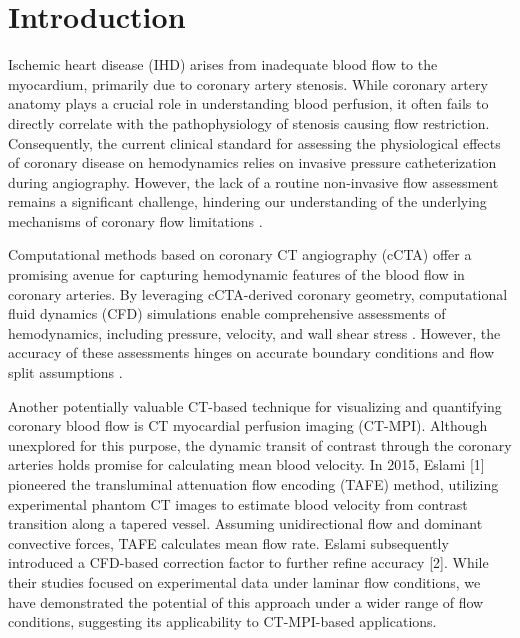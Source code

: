 \documentclass[times,twocolumn,final]{elsarticle}
\begin{document}



\section{Introduction}
Ischemic heart disease (IHD) arises from inadequate blood flow to the myocardium, primarily due to coronary artery stenosis. While coronary artery anatomy plays a crucial role in understanding blood perfusion, it often fails to directly correlate with the pathophysiology of stenosis causing flow restriction. Consequently, the current clinical standard for assessing the physiological effects of coronary disease on hemodynamics relies on invasive pressure catheterization during angiography. However, the lack of a routine non-invasive flow assessment remains a significant challenge, hindering our understanding of the underlying mechanisms of coronary flow limitations \cite{al2018percutaneous, toth2013fractional}.

Computational methods based on coronary CT angiography (cCTA) offer a promising avenue for capturing hemodynamic features of the blood flow in coronary arteries. By leveraging cCTA-derived coronary geometry, computational fluid dynamics (CFD) simulations enable comprehensive assessments of hemodynamics, including pressure, velocity, and wall shear stress \cite{assen2020computed,papamanolis2021myocardial,bove2003computational,he2022medical,khan2021low}. However, the accuracy of these assessments hinges on accurate boundary conditions and flow split assumptions \cite{kung2011vitro,cook2017diagnostic}.

Another potentially valuable CT-based technique for visualizing and quantifying coronary blood flow is CT myocardial perfusion imaging (CT-MPI). Although unexplored for this purpose, the dynamic transit of contrast through the coronary arteries holds promise for calculating mean blood velocity. In 2015, Eslami [1] pioneered the transluminal attenuation flow encoding (TAFE) method, utilizing experimental phantom CT images to estimate blood velocity from contrast transition along a tapered vessel. Assuming unidirectional flow and dominant convective forces, TAFE calculates mean flow rate. Eslami subsequently introduced a CFD-based correction factor to further refine accuracy [2]. While their studies focused on experimental data under laminar flow conditions, we have demonstrated the potential of this approach under a wider range of flow conditions, suggesting its applicability to CT-MPI-based applications.
\end{document}
